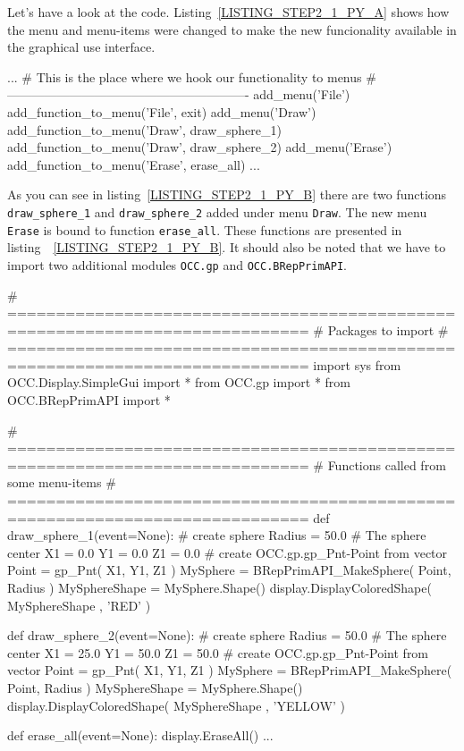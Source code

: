 Let's have a look at the code.
Listing~\ref{LISTING_STEP2_1_PY_A} shows how the menu and menu-items were changed to make the new funcionality available in the graphical use interface.
\begin{python}[moreemph={[4], 46, 48},caption={Step2\_1.py - Extending the menu},label=LISTING_STEP2_1_PY_A]
...
    # This is the place where we hook our functionality to menus
    # ----------------------------------------------------------
    add_menu('File')
    add_function_to_menu('File',  exit)
    add_menu('Draw')
    add_function_to_menu('Draw', draw_sphere_1)
    add_function_to_menu('Draw', draw_sphere_2)
    add_menu('Erase')
    add_function_to_menu('Erase', erase_all)
...    
\end{python}
As you can see in listing~\ref{LISTING_STEP2_1_PY_B} there are two functions {\tt draw\_sphere\_1} and {\tt draw\_sphere\_2} added under menu {\tt Draw}.
The new menu {\tt Erase} is bound to function {\tt erase\_all}.
These functions are presented in listing~~\ref{LISTING_STEP2_1_PY_B}.
It should also be noted that we have to import two additional modules {\tt OCC.gp} and {\tt OCC.BRepPrimAPI}.
%
\begin{python}[moreemph={[4], 46, 48},caption={Step2\_1.py - Extending the functionality},label=LISTING_STEP2_1_PY_B]
# =============================================================================
# Packages to import
# =============================================================================
import sys
from OCC.Display.SimpleGui import *
from OCC.gp import *
from OCC.BRepPrimAPI import * 

# =============================================================================
# Functions called from some menu-items
# =============================================================================
def draw_sphere_1(event=None):
    # create sphere
    Radius = 50.0
    # The sphere center
    X1 = 0.0
    Y1 = 0.0
    Z1 = 0.0
    # create OCC.gp.gp_Pnt-Point from vector
    Point = gp_Pnt( X1, Y1, Z1 )     
    MySphere = BRepPrimAPI_MakeSphere( Point, Radius )  
    MySphereShape = MySphere.Shape()
    display.DisplayColoredShape( MySphereShape , 'RED' ) 

def draw_sphere_2(event=None):
    # create sphere
    Radius = 50.0
    # The sphere center
    X1 = 25.0
    Y1 = 50.0
    Z1 = 50.0
    # create OCC.gp.gp_Pnt-Point from vector
    Point = gp_Pnt( X1, Y1, Z1 )     
    MySphere = BRepPrimAPI_MakeSphere( Point, Radius )  
    MySphereShape = MySphere.Shape()
    display.DisplayColoredShape( MySphereShape , 'YELLOW' ) 

def erase_all(event=None):
    display.EraseAll()
...    
\end{python}
